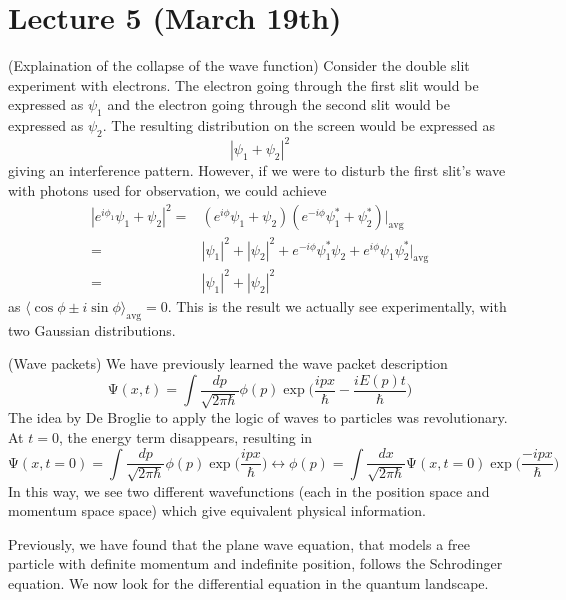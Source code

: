 \section{Lecture 5 (March 19th)}
\begin{thm}
(Explaination of the collapse of the wave function) Consider the double slit experiment with electrons. The electron going through the first slit would be expressed as $\psi _{1}$ and the electron going through the second slit would be expressed as $\psi _{2}$. The resulting distribution on the screen would be expressed as
\[|\psi _{1}+\psi _{2}|^2\]
giving an interference pattern. However, if we were to disturb the first slit's wave with photons used for observation, we could achieve
\begin{align*}
	|e^{i\phi_1}\psi _{1}+\psi _{2}|^2=&(e^{i\phi }\psi _{1}+\psi _{2})(e^{-i\phi}\psi _{1}^{*}+\psi_{2}^{*})\Big|_{\mathrm{avg}}\\
=&|\psi _{1}|^2+|\psi _{2}|^2+e^{-i\phi}\psi _{1}^{*}\psi _{2}+e^{i\phi }\psi _{1}\psi _{2}^{*}\Big|_{\mathrm{avg}}\\
=&|\psi _{1}|^2+|\psi _{2}|^2
\end{align*}
as $\langle \cos \phi\pm i\sin \phi\rangle _{\mathrm{avg}}=0$. This is the result we actually see experimentally, with two Gaussian distributions.
\end{thm}
\vspace{2ex}
\begin{defi}
(Wave packets) We have previously learned the wave packet description
\[\mathrm{\Psi}(x,t)=\int \dfrac{dp}{\sqrt{2\pi \hbar } }\phi (p)\exp\Big(\dfrac{ipx}{\hbar }-\dfrac{iE(p)t}{\hbar }\Big)\]
The idea by De Broglie to apply the logic of waves to particles was revolutionary. At $t=0$, the energy term disappears, resulting in
\[\mathrm{\Psi} (x,t=0)=\int \dfrac{dp}{\sqrt{2\pi \hbar }}\phi (p)\exp\Big(\dfrac{ipx}{\hbar }\Big)\longleftrightarrow \phi (p)=\int \dfrac{dx}{\sqrt{2\pi \hbar }}\mathrm{\Psi} (x,t=0)\exp\Big(\dfrac{-ipx}{\hbar }\Big) \]
In this way, we see two different wavefunctions (each in the position space and momentum space space) which give equivalent physical information.
\end{defi}
\vspace{2ex}
Previously, we have found that the plane wave equation, that models a free particle with definite momentum and indefinite position, follows the Schrodinger equation. We now look for the differential equation in the quantum landscape.
\\
